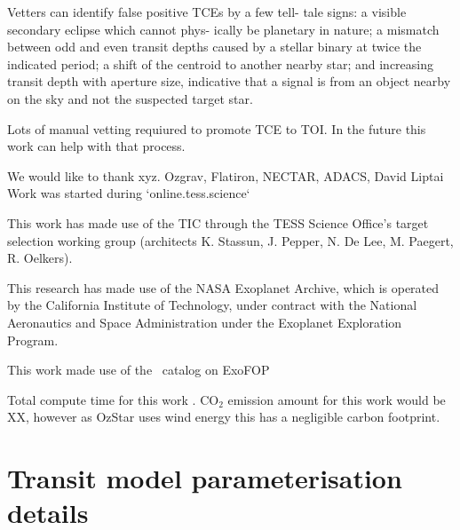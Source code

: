\documentclass[floatfix,ApJL,twocolumn]{aastex631}
\begin{document}
Vetters can identify false positive TCEs by a few tell- tale signs: a visible secondary eclipse which cannot phys- ically be planetary in nature; a mismatch between odd and even transit depths caused by a stellar binary at twice the indicated period; a shift of the centroid to another nearby star; and increasing transit depth with aperture size, indicative that a signal is from an object nearby on the sky and not the suspected target star.

Lots of manual vetting requiured to promote TCE to TOI. In the future this work can help with that process.


\begin{acknowledgments}

We would like to thank xyz.
Ozgrav, Flatiron, NECTAR, ADACS, David Liptai
Work was started during `online.tess.science`

This work has made use of the TIC through the TESS Science Office’s target selection working group (architects K. Stassun, J. Pepper, N. De Lee, M. Paegert, R. Oelkers).

This research has made use of the NASA Exoplanet Archive, which is operated by the California Institute of Technology, under contract with the National Aeronautics and Space Administration under the Exoplanet Exploration Program.

This work made use of the \tess\ catalog on ExoFOP

Total compute time for this work \red{\cpuHrs} . CO$_2$ emission amount for this work would be XX, however as OzStar uses wind energy this has a negligible carbon footprint.

\end{acknowledgments}

\vspace{5mm}



{}



\appendix

\section{Transit model parameterisation details}\label{apdx:model_details}
\end{document}
